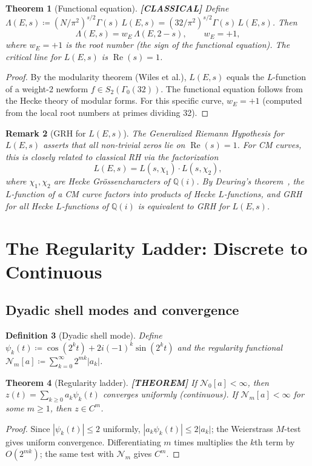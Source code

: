 \documentclass[11pt]{article}
\theoremstyle{tight}
\newtheorem{theorem}{Theorem}[section]
\theoremstyle{plainroman}
\newtheorem{remark}[theorem]{Remark}
\newtheorem{definition}[theorem]{Definition}
\newcommand{\Q}{\mathbb{Q}}
\newcommand{\Nreg}{\mathcal{N}}
\begin{document}
\begin{theorem}[Functional equation]\label{thm:funcL}
\textbf{[CLASSICAL]}
Define $\Lambda(E,s)\coloneqq(N/\pi^2)^{s/2}\Gamma(s)\,L(E,s)=(32/\pi^2)^{s/2}\Gamma(s)\,L(E,s)$.
Then
\[
\Lambda(E,s)=w_E\,\Lambda(E,2-s), \qquad w_E=+1,
\]
where $w_E=+1$ is the root number (the sign of the functional equation).
The critical line for $L(E,s)$ is $\operatorname{Re}(s)=1$.
\end{theorem}
\begin{proof}
By the modularity theorem (Wiles et al.), $L(E,s)$ equals the $L$-function of a weight-2 newform $f\in S_2(\Gamma_0(32))$.
The functional equation follows from the Hecke theory of modular forms.
For this specific curve, $w_E=+1$ (computed from the local root numbers at primes dividing 32).
\end{proof}

\begin{remark}[GRH for $L(E,s)$]
The Generalized Riemann Hypothesis for $L(E,s)$ asserts that all non-trivial zeros lie on $\operatorname{Re}(s)=1$.
For CM curves, this is closely related to classical RH via the factorization
\[
L(E,s)=L(s,\chi_1)\cdot L(s,\chi_2),
\]
where $\chi_1,\chi_2$ are Hecke Gr\"ossencharacters of $\Q(i)$.
By Deuring's theorem~\cite{deuring}, the $L$-function of a CM curve factors into products of Hecke $L$-functions, and GRH for all Hecke $L$-functions of $\Q(i)$ is equivalent to GRH for $L(E,s)$.
\end{remark}

\section{The Regularity Ladder: Discrete to Continuous}

\subsection{Dyadic shell modes and convergence}

\begin{definition}[Dyadic shell mode]
Define $\psi_k(t)\coloneqq\cos(2^k t)+2i(-1)^k\sin(2^k t)$ and the regularity functional $\Nreg_m[a]\coloneqq\sum_{k=0}^\infty 2^{mk}|a_k|$.
\end{definition}

\begin{theorem}[Regularity ladder]\label{thm:regularity}
\textbf{[THEOREM]}
If $\Nreg_0[a]<\infty$, then $z(t)=\sum_{k\ge 0}a_k\psi_k(t)$ converges uniformly (continuous).
If $\Nreg_m[a]<\infty$ for some $m\ge 1$, then $z\in C^m$.
\end{theorem}
\begin{proof}
Since $|\psi_k(t)|\le 2$ uniformly, $|a_k\psi_k(t)|\le 2|a_k|$; the Weierstrass $M$-test gives uniform convergence.
Differentiating $m$ times multiplies the $k$th term by $O(2^{mk})$; the same test with $\Nreg_m$ gives $C^m$.
\end{proof}
\end{document}
